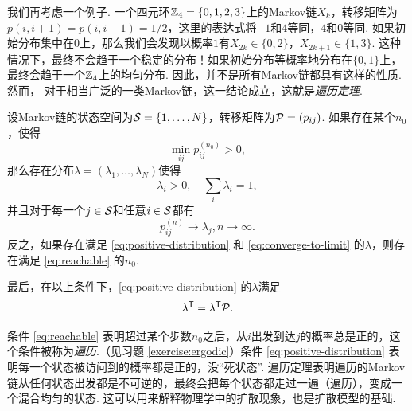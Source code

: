我们再考虑一个例子. 一个四元环$\mathbb{Z}_4=\{0,1,2,3\}$上的Markov链$X_k$，转移矩阵为$p(i,i+1)=p(i,i-1)=1/2$，这里的表达式将$-1$和$4$等同，$4$和$0$等同. 如果初始分布集中在$0$上，那么我们会发现以概率$1$有$X_{2k}\in\{0,2\}$，$X_{2k+1}\in\{1,3\}$. 这种情况下，最终不会趋于一个稳定的分布！如果初始分布等概率地分布在$\{0,1\}$上，最终会趋于一个$\mathbb{Z}_4$上的均匀分布. 因此，并不是所有Markov链都具有这样的性质. 然而， 对于相当广泛的一类Markov链，这一结论成立，这就是\textit{遍历定理}.

\begin{theorem}[遍历定理]\label{thm:ergodic-theorem}
    设Markov链的状态空间为$\mathcal S=\{1,\dots,N\}$，转移矩阵为$\mathcal P=(p_{ij})$. 如果存在某个$n_0$，使得
    \begin{equation}
        \min_{ij}p_{ij}^{(n_0)}>0,\label{eq:reachable}
    \end{equation}
    那么存在分布$\lambda=(\lambda_1,\dots,\lambda_N)$使得
    \begin{equation}
        \lambda_i>0,\quad\sum_i\lambda_i=1,\label{eq:positive-distribution}
    \end{equation}
    并且对于每一个$j\in\mathcal S$和任意$i\in\mathcal S$都有
    \begin{equation}
    p_{ij}^{(n)}\to\lambda_j,n\to\infty.\label{eq:converge-to-limit}
    \end{equation}
    反之，如果存在满足 \eqref{eq:positive-distribution} 和 \eqref{eq:converge-to-limit} 的$\lambda$，则存在满足 \eqref{eq:reachable} 的$n_0$.

    最后，在以上条件下，\eqref{eq:positive-distribution} 的$\lambda$满足
    \begin{equation}
        \lambda^{\mathsf{T}} = \lambda^{\mathsf{T}}\mathcal P.\label{eq:stationary}
    \end{equation}
\end{theorem}

条件 \eqref{eq:reachable} 表明超过某个步数$n_0$之后，从$i$出发到达$j$的概率总是正的，这个条件被称为\textit{遍历}.（见习题 \ref{exercise:ergodic}）条件 \eqref{eq:positive-distribution} 表明每一个状态被访问到的概率都是正的，没“死状态”. 遍历定理表明遍历的Markov链从任何状态出发都是不可逆的，最终会把每个状态都走过一遍（遍历），变成一个混合均匀的状态. 这可以用来解释物理学中的扩散现象，也是扩散模型的基础.

